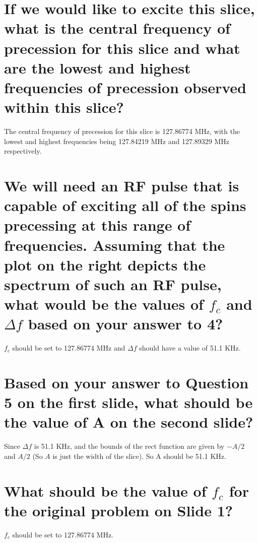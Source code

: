 \documentclass{article}
\begin{document}
\section{If we would like to excite this slice, what is the central frequency of precession for this slice and what are the lowest and highest frequencies of precession observed within this slice?}
The central frequency of precession for this slice is 127.86774 MHz, with the lowest and highest frequencies being
127.84219 MHz and 127.89329 MHz respectively.

\section{We will need an RF pulse that is capable of exciting all of the spins precessing at this range of frequencies. Assuming that the plot on the right depicts the spectrum of such an RF pulse, what would be the values of $f_c$ and $\Delta f$ based on your answer to 4?}
$f_c$ should be set to 127.86774 MHz and $\Delta f$ should have a value of 51.1 KHz.

\section{Based on your answer to Question 5 on the first slide, what should be the value of A on the second slide?}
Since $\Delta f$ is 51.1 KHz, and the bounds of the rect function are given by $-A/2$ and $A/2$ (So $A$ is just the width of the slice).
So A should be 51.1 KHz.

\section{What should be the value of $f_c$ for the original problem on Slide 1?}
$f_c$ should be set to 127.86774 MHz.
\end{document}
